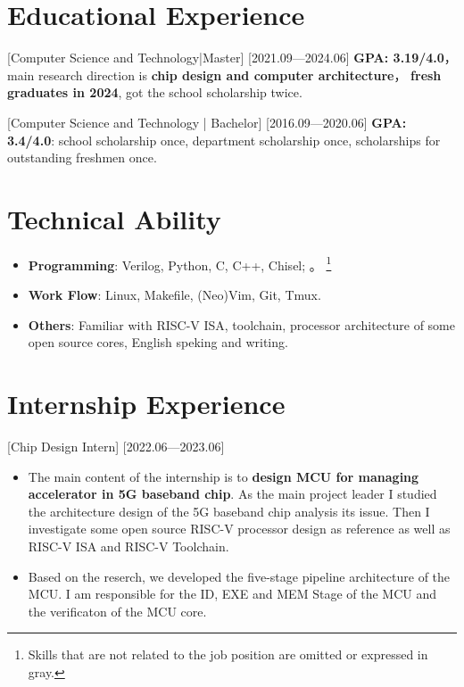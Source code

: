 \documentclass{resume}
\begin{document}

\ResumeTitle

\section{Educational Experience}
[\textnormal{Computer Science and Technology}|Master]
[2021.09—2024.06]
\textbf{GPA: 3.19/4.0}，main research direction is \textbf{chip design and computer architecture}，
\textbf{fresh graduates in 2024}, got the school scholarship twice.

[\textnormal{Computer Science and Technology} | Bachelor]
[2016.09—2020.06]
\textbf{GPA: 3.4/4.0}: school scholarship once, department scholarship once, scholarships for outstanding freshmen once.

\section{Technical Ability}
\begin{itemize}
  \item \textbf{Programming}: Verilog, Python, C, C++, Chisel; 。
      \footnote{Skills that are not related to the job position are omitted or expressed in gray.}
  \item \textbf{Work Flow}: Linux, Makefile, (Neo)Vim, Git, Tmux.
  \item \textbf{Others}: Familiar with RISC-V ISA, toolchain, processor architecture of some open source cores, English speking and writing.
\end{itemize}

\section{Internship Experience}

[Chip Design Intern]
[2022.06—2023.06] 
\begin{itemize}
    \item The main content of the internship is to \textbf{design MCU for managing accelerator in 5G baseband chip}. As the main project leader
        I studied the architecture design of the 5G baseband chip analysis its issue. 
        Then I investigate some open source RISC-V processor design as reference as well as RISC-V ISA and RISC-V Toolchain. 
    \item Based on the reserch, we developed the five-stage pipeline architecture of the MCU. I am responsible for the ID, EXE and MEM Stage of the MCU and the verificaton of the MCU core.
\end{itemize}
\end{document}
